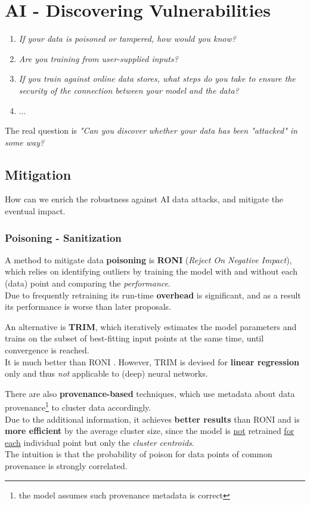 \chapter{AI - Discovering Vulnerabilities}
\begin{enumerate}
   \item \textit{If your data is poisoned or tampered, how would you know?}
   \item \textit{Are you training from user-supplied inputs?}
   \item \textit{If you train against online data stores, what steps do you take to ensure the security of the connection between your model and the data?}
   \item ...
\end{enumerate}

The real question is \emph{"Can you discover whether your data has been \emph{"attacked"} in some way?}

\section{Mitigation}
How can we enrich the robustness against AI data attacks, and mitigate the eventual impact.
\subsection{Poisoning - Sanitization}
A method to mitigate data \textbf{poisoning} is \textbf{RONI} (\textit{Reject On Negative Impact}), which relies on identifying outliers by training the model with and without each (data) point and comparing the \textit{performance}.\\
Due to frequently retraining its run-time \textbf{overhead} is significant,
and as a result its performance is worse than later proposals.

An alternative is \textbf{TRIM},
which iteratively estimates the model parameters and trains on the
subset of best-fitting input points at the same time, until convergence is reached.\\
It is much better than RONI \smiley.
However, TRIM is devised for \textbf{linear regression} only and thus \textit{not} applicable to (deep) neural networks.

There are also \textbf{provenance-based} techniques, which use metadata about data provenance\footnote{the model assumes such provenance metadata is correct}
to cluster data accordingly.\\
Due to the additional information, it achieves \textbf{better results} than RONI and
is \textbf{more efficient} by the average cluster size, since the model is \underline{not}
retrained \underline{for each} individual point but only the \textit{cluster centroids}.\\
The intuition is that the probability of poison for data points of common
provenance is strongly correlated.

